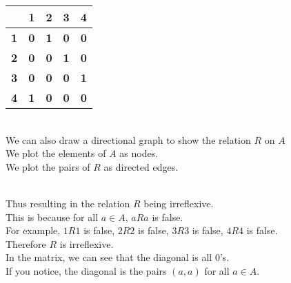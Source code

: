 \begin{tabular}{|c|c|c|c|c|}
\hline
\multicolumn{1}{|c|}{\textbf{}} & \multicolumn{1}{c|}{\textbf{1}} & \multicolumn{1}{c|}{\textbf{2}} & \multicolumn{1}{c|}{\textbf{3}} & \multicolumn{1}{c|}{\textbf{4}} \\ \hline
\multicolumn{1}{|c|}{\textbf{1}} & \multicolumn{1}{c|}{\textbf{0}} & \multicolumn{1}{c|}{\textbf{1}} & \multicolumn{1}{c|}{\textbf{0}} & \multicolumn{1}{c|}{\textbf{0}} \\ \hline
\multicolumn{1}{|c|}{\textbf{2}} & \multicolumn{1}{c|}{\textbf{0}} & \multicolumn{1}{c|}{\textbf{0}} & \multicolumn{1}{c|}{\textbf{1}} & \multicolumn{1}{c|}{\textbf{0}} \\ \hline
\multicolumn{1}{|c|}{\textbf{3}} & \multicolumn{1}{c|}{\textbf{0}} & \multicolumn{1}{c|}{\textbf{0}} & \multicolumn{1}{c|}{\textbf{0}} & \multicolumn{1}{c|}{\textbf{1}} \\ \hline
\multicolumn{1}{|c|}{\textbf{4}} & \multicolumn{1}{c|}{\textbf{1}} & \multicolumn{1}{c|}{\textbf{0}} & \multicolumn{1}{c|}{\textbf{0}} & \multicolumn{1}{c|}{\textbf{0}} \\ \hline
\end{tabular} \\
We can also draw a directional graph to show the relation $R$ on $A$ \\
We plot the elements of $A$ as nodes. \\
We plot the pairs of $R$ as directed edges. \\
 \\
Thus resulting in the relation $R$ being irreflexive. \\
This is because for all $a \in A$, $aRa$ is false. \\
For example, $1R1$ is false, $2R2$ is false, $3R3$ is false, $4R4$ is false. \\
Therefore $R$ is irreflexive. \\
In the matrix, we can see that the diagonal is all 0's. \\
If you notice, the diagonal is the pairs $(a,a)$ for all $a \in A$. \\
